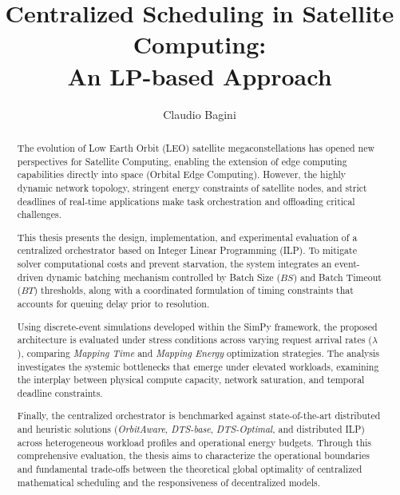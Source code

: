 \documentclass[english, oneside]{sapthesis}
\title{Centralized Scheduling in Satellite Computing:\\ An LP-based Approach}
\author{Claudio Bagini}
\begin{document}
\frontmatter
\maketitle

\dedication{To countless cups of coffee, endless iterations,\\
and the version of me that refused to drop the task.}

\begin{abstract}
The evolution of Low Earth Orbit (LEO) satellite megaconstellations has opened new perspectives for Satellite Computing, enabling the extension of edge computing capabilities directly into space (Orbital Edge Computing). However, the highly dynamic network topology, stringent energy constraints of satellite nodes, and strict deadlines of real-time applications make task orchestration and offloading critical challenges.

This thesis presents the design, implementation, and experimental evaluation of a centralized orchestrator based on Integer Linear Programming (ILP). To mitigate solver computational costs and prevent starvation, the system integrates an event-driven dynamic batching mechanism controlled by Batch Size ($BS$) and Batch Timeout ($BT$) thresholds, along with a coordinated formulation of timing constraints that accounts for queuing delay prior to resolution.

Using discrete-event simulations developed within the SimPy framework, the proposed architecture is evaluated under stress conditions across varying request arrival rates ($\lambda$), comparing \emph{Mapping Time} and \emph{Mapping Energy} optimization strategies. The analysis investigates the systemic bottlenecks that emerge under elevated workloads, examining the interplay between physical compute capacity, network saturation, and temporal deadline constraints.

Finally, the centralized orchestrator is benchmarked against state-of-the-art distributed and heuristic solutions (\emph{OrbitAware}, \emph{DTS-base}, \emph{DTS-Optimal}, and distributed ILP) across heterogeneous workload profiles and operational energy budgets. Through this comprehensive evaluation, the thesis aims to characterize the operational boundaries and fundamental trade-offs between the theoretical global optimality of centralized mathematical scheduling and the responsiveness of decentralized models.
\end{abstract}

\tableofcontents

\mainmatter








\backmatter
\cleardoublepage
{}
{}


\end{document}
